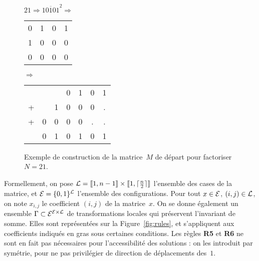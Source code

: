 \begin{figure}[h]
\centering

$21 \Rightarrow \overline{10101}^2 \Rightarrow$
\begin{tabular}{cccc}
0&1&0&1\\
1&0&0&0\\
0&0&0&0\\
\end{tabular}
$\Rightarrow$
\begin{tabular}{ccccccc}
&&&0&1&0&1\\
+&&1&0&0&0&.\\
+&0&0&0&0&.&.\\
\hline
&0&1&0&1&0&1\\
\end{tabular}

\caption{Exemple de construction de la matrice~$M$ de départ pour factoriser $N=21$.}
\label{fig:init}
\end{figure}

Formellement, on pose $\mathcal{L}=[\kern-0.15em [ 1, n-1 ]\kern-0.15em] \times [\kern-0.15em [ 1, \lceil\frac{n}{2}\rceil]\kern-0.15em]$ l'ensemble des cases de la matrice, et $\mathcal{E}=\{0,1\}^{\mathcal{L}}$ l'ensemble des configurations. Pour tout $x \in \mathcal{E}$, $(i,j)\in\mathcal{L}$, on note $x_{i,j}$ le coefficient $(i,j)$ de la matrice~$x$. 
On se donne également un ensemble $\Gamma \subset \mathcal{E}^{\mathcal{E}\times\mathcal{L}}$ de transformations locales qui préservent l'invariant de somme. Elles sont représentées sur la Figure~\ref{fig:rules}, et s'appliquent aux coefficients indiqués en gras sous certaines conditions. Les règles \textbf{R5} et \textbf{R6} ne sont en fait pas nécessaires pour l'accessibilité des solutions : on les introduit par symétrie, pour ne pas privilégier de direction de déplacements des~$1$. 


